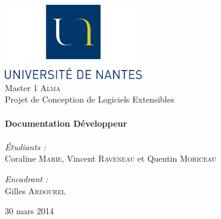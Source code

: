 
\begin{titlepage}
\begin{center}

\includegraphics[width=0.45\textwidth]{../figures/logoUN.png}~\\[2cm]

\LARGE{Master 1 \textsc{Alma}}\\[1.5cm]

\Large{Projet de Conception de Logiciels Extensibles}\\[0.5cm]

\HRule \\[0.4cm]
{ \huge \bfseries Documentation Développeur \\[0.4cm] }
\HRule \\[1.5cm]

\normalsize	
\emph{\'Etudiants :}\\
Coraline \textsc{Marie}, Vincent \textsc{Raveneau} et Quentin \textsc{Moriceau}

\vspace{0.5cm}

\emph{Encadrant :} \\
Gilles \textsc{Ardourel}

\vfill

{\large 30 mars 2014}

\end{center}
\end{titlepage}
